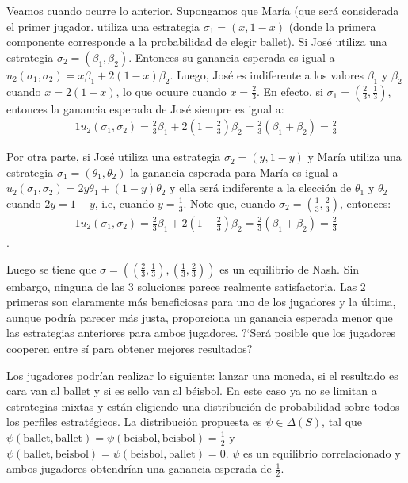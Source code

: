 Veamos cuando ocurre lo anterior. Supongamos que María (que será considerada el primer jugador. utiliza una estrategia $\sigma_1 = (x, 1-x)$ (donde la primera componente corresponde a la probabilidad de elegir ballet). Si José utiliza una estrategia $\sigma_2 = (\beta_1, \beta_2)$. Entonces su ganancia esperada es igual a $u_2(\sigma_1, \sigma_2) = x\beta_1 + 2(1-x)\beta_2$. Luego, José es indiferente a los valores $\beta_1$ y $\beta_2$ cuando $x = 2(1-x)$, lo que ocuure cuando $x = \frac{2}{3}$. En efecto, si $\sigma_1 = \left(\frac{2}{3}, \frac{1}{3} \right)$, entonces la ganancia esperada de José siempre es igual a:
\begin{alignat}{1}
u_2(\sigma_1, \sigma_2) = \frac{2}{3}\beta_1 + 2\left(1-\frac{2}{3} \right)\beta_2 = \frac{2}{3}(\beta_1 + \beta_2) = \frac{2}{3}
\end{alignat}

Por otra parte, si José utiliza una estrategia $\sigma_2 = (y, 1-y)$ y María utiliza una estrategia $\sigma_1 = (\theta_1, \theta_2)$ la ganancia esperada para María es igual a $u_2(\sigma_1, \sigma_2) = 2y\theta_1 + (1-y)\theta_2$ y ella será indiferente a la elección de $\theta_1$ y $\theta_2$ cuando $2y = 1-y$, i.e, cuando $y = \frac{1}{3}$. Note que, cuando $\sigma_2 = \left(\frac{1}{3}, \frac{2}{3} \right)$, entonces:
\begin{alignat}{1}
u_2(\sigma_1, \sigma_2) = \frac{2}{3}\beta_1 + 2\left(1-\frac{2}{3} \right)\beta_2 = \frac{2}{3}(\beta_1 + \beta_2) = \frac{2}{3}
\end{alignat}.

Luego se tiene que $\sigma = ((\frac{2}{3}, \frac{1}{3}), (\frac{1}{3}, \frac{2}{3}))$ es un equilibrio de Nash. Sin embargo, ninguna de las $3$ soluciones parece realmente satisfactoria. Las $2$ primeras son claramente más beneficiosas para uno de los jugadores y la última, aunque podría parecer más justa, proporciona un ganancia esperada menor que las estrategias anteriores para ambos jugadores. ?`Será posible que los jugadores cooperen entre sí para obtener mejores resultados?

Los jugadores podrían realizar lo siguiente: lanzar una moneda, si el resultado es cara van al ballet y si es sello van al béisbol. En este caso ya no se limitan a estrategias mixtas y están eligiendo una distribución de probabilidad sobre todos los perfiles estratégicos. La distribución propuesta es $\psi \in \Delta(S)$, tal que $\psi(\text{ballet}, \text{ballet}) = \psi(\text{beisbol}, \text{beisbol}) = \frac{1}{2}$ y $\psi(\text{ballet}, \text{beisbol}) = \psi(\text{beisbol}, \text{ballet}) =0$. $\psi$ es un equilibrio correlacionado y ambos jugadores obtendrían una ganancia esperada de $\frac{1}{2}$.